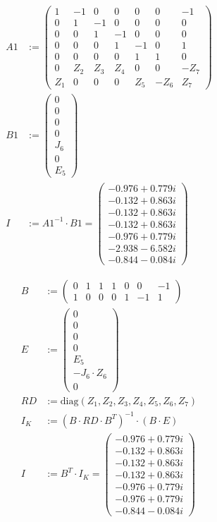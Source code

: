 \begin{align*}
A1 &:= \begin{pmatrix} 
1 & -1 & 0 & 0 & 0 & 0 & -1 \\ 
0 & 1 & -1 & 0 & 0 & 0 & 0 \\ 
0 & 0 & 1 & -1 & 0 & 0 & 0 \\ 
0 & 0 & 0 & 1 & -1 & 0 & 1 \\ 
0 & 0 & 0 & 0 & 1 & 1 & 0 \\ 
0 & Z_2 & Z_3 & Z_4 & 0 & 0 & -Z_7 \\ 
Z_1 & 0 & 0 & 0 & Z_5 & -Z_6 & Z_7 
\end{pmatrix} \\[1em]
B1 &:= \begin{pmatrix} 0 \\ 0 \\ 0 \\ 0 \\ J_6 \\ 0 \\ E_5 \end{pmatrix} \\[1em]
I &:= A1^{-1} \cdot B1 = \begin{pmatrix} 
-0.976 + 0.779i \\ 
-0.132 + 0.863i \\ 
-0.132 + 0.863i \\ 
-0.132 + 0.863i \\ 
-0.976 + 0.779i \\ 
-2.938 - 6.582i \\ 
-0.844 - 0.084i 
\end{pmatrix}
\end{align*}


\begin{align*}
B &:= \begin{pmatrix} 
0 & 1 & 1 & 1 & 0 & 0 & -1 \\ 
1 & 0 & 0 & 0 & 1 & -1 & 1 
\end{pmatrix} \\[1em]
E &:= \begin{pmatrix} 0 \\ 0 \\ 0 \\ 0 \\ E_5 \\ -J_6 \cdot Z_6 \\ 0 \end{pmatrix} \\[1em]
RD &:= \text{diag}(Z_1, Z_2, Z_3, Z_4, Z_5, Z_6, Z_7) \\[1em]
I_K &:= (B \cdot RD \cdot B^T)^{-1} \cdot (B \cdot E) \\[1em]
I &:= B^T \cdot I_K = \begin{pmatrix} 
-0.976 + 0.779i \\ 
-0.132 + 0.863i \\ 
-0.132 + 0.863i \\ 
-0.132 + 0.863i \\ 
-0.976 + 0.779i \\ 
-0.976 + 0.779i \\ 
-0.844 - 0.084i 
\end{pmatrix}
\end{align*}


